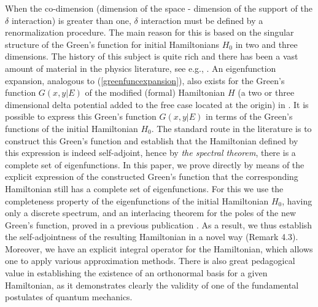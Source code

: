 \documentclass[amsmath,amssymb,14pt]{article}
\numberwithin{equation}{section}
\begin{document}
When the co-dimension (dimension of the space - dimension of the support of the $\delta$ interaction) is greater than one, $\delta$ interaction must be defined by a renormalization procedure. The main reason for this is based on the singular structure of the Green's function for initial Hamiltonians $H_0$ in two and three dimensions. The history of this subject is quite rich and there has been a vast amount of material in the physics literature, see e.g., \cite{Hoppe, Huang, Jackiw, GosdzinskyTarrach, MeadGodines, ManuelTarrach, Cavalcanti, Coutinho1, Patil, Coutinho2}. An eigenfunction expansion, analogous to (\ref{greenfuncexpansion}), also exists for the   Green's function $G(x,y|E)$ of the modified (formal) Hamiltonian $H$ (a two or three dimensional delta potential added to the free case located at the origin) in \cite{Cavalcanti}. It is possible to express this Green's function $G(x,y|E)$ in terms of the Green's functions of the initial Hamiltonian $H_0$. The standard route in the literature is to construct this Green's function and establish that the Hamiltonian defined by this expression is indeed self-adjoint, hence by {\it the spectral theorem}, there is a complete set of eigenfunctions. In this paper, we prove directly by means of the explicit expression of the constructed Green's function that the corresponding Hamiltonian still has a complete set of eigenfunctions. For this we use the completeness property of the eigenfunctions of the initial Hamiltonian $H_0$,  having only a  discrete spectrum, and an interlacing theorem for the poles of the new Green's function, proved in a previous publication \cite{Annals23}. As a result, we thus establish the self-adjointness  of the resulting Hamiltonian in a novel way (Remark 4.3). Moreover, we have an explicit integral operator for the Hamiltonian, which allows one to apply various approximation methods. There is also great pedagogical value in establishing the existence of an orthonormal basis for a given Hamiltonian, as it demonstrates clearly the validity of one of the fundamental postulates of quantum mechanics. 
\end{document}
